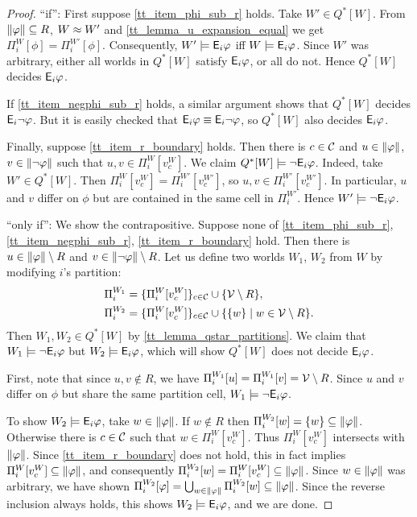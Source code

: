 \begin{proof}

    ``if'': First suppose \cref{tt_item_phi_sub_r} holds. Take $W' \in Q^*[W]$.
    From $\|{\varphi}\| \subseteq R$, $W \approx W'$ and
    \cref{tt_lemma_u_expansion_equal} we get $\Pi^W_i[\phi] = \Pi^{W'}_i[\phi]$.
    Consequently, $W' \models \mathsf{E}_i\varphi$ iff $W \models \mathsf{E}_i\varphi$. Since $W'$
    was arbitrary, either all worlds in $Q^*[W]$ satisfy $\mathsf{E}_i\varphi$, or all do
    not. Hence $Q^*[W]$ decides $\mathsf{E}_i\varphi$.

    If \cref{tt_item_negphi_sub_r} holds, a similar argument shows that $Q^*[W]$
    decides $\mathsf{E}_i\neg\varphi$. But it is easily checked that $\mathsf{E}_i\varphi \equiv
    \mathsf{E}_i\neg\varphi$, so $Q^*[W]$ also decides $\mathsf{E}_i\varphi$.

    Finally, suppose \cref{tt_item_r_boundary} holds. Then there is $c \in \mathcal{C}$
    and $u \in \|{\varphi}\|$, $v \in \|{\neg\varphi}\|$ such that $u, v
    \in \Pi^W_i[v^W_c]$. We claim $Q^*[W] \models \neg\mathsf{E}_i\varphi$. Indeed, take
    $W' \in Q^*[W]$. Then $\Pi^W_i[v^W_c] = \Pi^{W'}_i[v^{W'}_c]$, so $u, v \in
    \Pi^{W'}_i[v^{W'}_c]$. In particular, $u$ and $v$ differ on $\phi$ but are
    contained in the same cell in $\Pi^{W'}_i$. Hence $W' \models
    \neg\mathsf{E}_i\varphi$.

    ``only if'': We show the contrapositive. Suppose none of
    \cref{tt_item_phi_sub_r}, \cref{tt_item_negphi_sub_r}, \cref{tt_item_r_boundary}
    hold. Then there is $u \in \|{\varphi}\| \setminus R$ and $v \in
    \|{\neg\varphi}\| \setminus R$. Let us define two worlds $W_1$, $W_2$
    from $W$ by modifying $i$'s partition:
    \begin{align*}
        \Pi^{W_1}_i
            &= \{\Pi^W_i[v^W_c]\}_{c \in \mathcal{C}} \cup \{\mathcal{V} \setminus R \}, \\
        \Pi^{W_2}_i
            &= \{\Pi^W_i[v^W_c]\}_{c \in \mathcal{C}} \cup \{\{w\} \mid w \in \mathcal{V}
                    \setminus R\}.
    \end{align*}
    Then $W_1, W_2 \in Q^*[W]$ by \cref{tt_lemma_qstar_partitions}. We claim that
    $W_1 \models \neg\mathsf{E}_i\varphi$ but $W_2 \models \mathsf{E}_i\varphi$, which will show
    $Q^*[W]$ does not decide $\mathsf{E}_i\varphi$.

    First, note that since $u, v \notin R$, we have $\Pi^{W_1}_i[u] =
    \Pi^{W_1}_i[v] = \mathcal{V} \setminus R$. Since $u$ and $v$ differ on $\phi$ but
    share the same partition cell, $W_1 \models \neg\mathsf{E}_i\varphi$.

    To show $W_2 \models \mathsf{E}_i\varphi$, take $w \in \|{\varphi}\|$. If $w \notin
    R$ then $\Pi^{W_2}_i[w] = \{w\} \subseteq \|{\varphi}\|$. Otherwise there
    is $c \in \mathcal{C}$ such that $w \in \Pi^W_i[v^W_c]$. Thus $\Pi^W_i[v^W_c]$
    intersects with $\|{\varphi}\|$. Since \cref{tt_item_r_boundary} does not
    hold, this in fact implies $\Pi^W_i[v^W_c] \subseteq \|{\varphi}\|$, and
    consequently $\Pi^{W_2}_i[w] = \Pi^W_i[v^W_c] \subseteq \|{\varphi}\|$.
    Since $w \in \|{\varphi}\|$ was arbitrary, we have shown
    $\Pi^{W_2}_i[\varphi] = \bigcup_{w \in \|{\varphi}\|}{\Pi^{W_2}_i[w]}
    \subseteq \|{\varphi}\|$. Since the reverse inclusion always holds, this
    shows $W_2 \models \mathsf{E}_i\varphi$, and we are done.
\end{proof}

